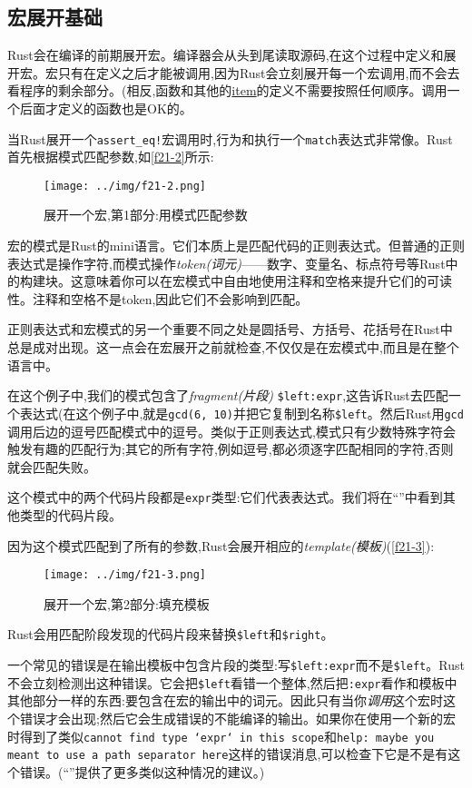 \subsection{宏展开基础}
Rust会在编译的前期展开宏。编译器会从头到尾读取源码,在这个过程中定义和展开宏。宏只有在定义之后才能被调用,因为Rust会立刻展开每一个宏调用,而不会去看程序的剩余部分。(相反,函数和其他的\hyperref[static]{item}的定义不需要按照任何顺序。调用一个后面才定义的函数也是OK的。

当Rust展开一个\texttt{assert\_eq!}宏调用时,行为和执行一个\texttt{match}表达式非常像。Rust首先根据模式匹配参数,如\autoref{f21-2}所示:
\begin{figure}[htbp]
    \centering
    \texttt{[image: ../img/f21-2.png]}
    \caption{展开一个宏,第1部分:用模式匹配参数}
    \label{f21-2}
\end{figure}

宏的模式是Rust的mini语言。它们本质上是匹配代码的正则表达式。但普通的正则表达式是操作字符,而模式操作\emph{token(词元)}——数字、变量名、标点符号等Rust中的构建块。这意味着你可以在宏模式中自由地使用注释和空格来提升它们的可读性。注释和空格不是token,因此它们不会影响到匹配。

正则表达式和宏模式的另一个重要不同之处是圆括号、方括号、花括号在Rust中总是成对出现。这一点会在宏展开之前就检查,不仅仅是在宏模式中,而且是在整个语言中。

在这个例子中,我们的模式包含了\emph{fragment(片段)} \texttt{\$left:expr},这告诉Rust去匹配一个表达式(在这个例子中,就是\texttt{gcd(6, 10)}并把它复制到名称\texttt{\$left}。然后Rust用\texttt{gcd}调用后边的逗号匹配模式中的逗号。类似于正则表达式,模式只有少数特殊字符会触发有趣的匹配行为;其它的所有字符,例如逗号,都必须逐字匹配相同的字符,否则就会匹配失败。

这个模式中的两个代码片段都是\texttt{expr}类型:它们代表表达式。我们将在“”中看到其他类型的代码片段。

因为这个模式匹配到了所有的参数,Rust会展开相应的\emph{template(模板)}(\autoref{f21-3}):
\begin{figure}[htbp]
    \centering
    \texttt{[image: ../img/f21-3.png]}
    \caption{展开一个宏,第2部分:填充模板}
    \label{f21-3}
\end{figure}

Rust会用匹配阶段发现的代码片段来替换\texttt{\$left}和\texttt{\$right}。

一个常见的错误是在输出模板中包含片段的类型:写\texttt{\$left:expr}而不是\texttt{\$left}。Rust不会立刻检测出这种错误。它会把\texttt{\$left}看错一个整体,然后把\texttt{:expr}看作和模板中其他部分一样的东西:要包含在宏的输出中的词元。因此只有当你\emph{调用}这个宏时这个错误才会出现;然后它会生成错误的不能编译的输出。如果你在使用一个新的宏时得到了类似\texttt{cannot find type `expr` in this scope}和\texttt{help: maybe you meant to use a path separator here}这样的错误消息,可以检查下它是不是有这个错误。(“”提供了更多类似这种情况的建议。)

